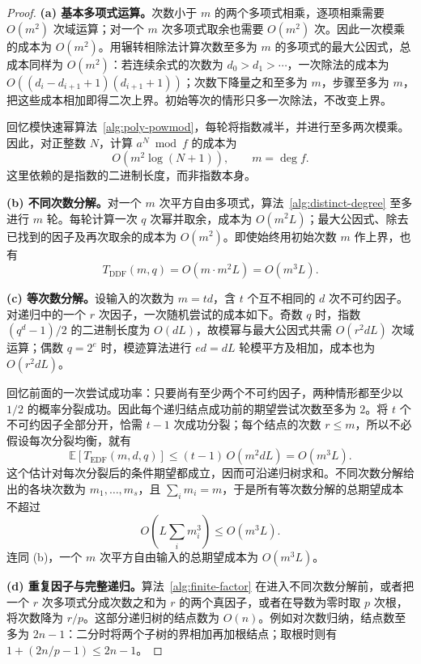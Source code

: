 \documentclass[lang=cn,a4paper,fontset=none,zihao=false,10pt,openany,twoside]{beautybook}
\numberwithin{algorithm}{chapter}
\begin{document}
\begin{proof}
\par\smallskip\noindent\textbf{(a) 基本多项式运算。}\quad 次数小于 $m$ 的两个多项式相乘，逐项相乘需要 $O(m^2)$ 次域运算；对一个 $m$ 次多项式取余也需要 $O(m^2)$ 次。因此一次模乘的成本为 $O(m^2)$。用辗转相除法计算次数至多为 $m$ 的多项式的最大公因式，总成本同样为 $O(m^2)$：若连续余式的次数为 $d_0>d_1>\cdots$，一次除法的成本为 $O((d_i-d_{i+1}+1)(d_{i+1}+1))$；次数下降量之和至多为 $m$，步骤至多为 $m$，把这些成本相加即得二次上界。初始等次的情形只多一次除法，不改变上界。

回忆模快速幂算法~\ref{alg:poly-powmod}，每轮将指数减半，并进行至多两次模乘。因此，对正整数 $N$，计算 $a^N\bmod f$ 的成本为
\[
 O(m^2\log(N+1)),\qquad m=\deg f.
\]
这里依赖的是指数的二进制长度，而非指数本身。

\par\smallskip\noindent\textbf{(b) 不同次数分解。}\quad 对一个 $m$ 次平方自由多项式，算法~\ref{alg:distinct-degree} 至多进行 $m$ 轮。每轮计算一次 $q$ 次幂并取余，成本为 $O(m^2L)$；最大公因式、除去已找到的因子及再次取余的成本为 $O(m^2)$。即使始终用初始次数 $m$ 作上界，也有
\[
 T_{\mathrm{DDF}}(m,q)=O(m\cdot m^2L)=O(m^3L).
\]

\par\smallskip\noindent\textbf{(c) 等次数分解。}\quad 设输入的次数为 $m=td$，含 $t$ 个互不相同的 $d$ 次不可约因子。对递归中的一个 $r$ 次因子，一次随机尝试的成本如下。奇数 $q$ 时，指数 $(q^d-1)/2$ 的二进制长度为 $O(dL)$，故模幂与最大公因式共需 $O(r^2dL)$ 次域运算；偶数 $q=2^e$ 时，模迹算法进行 $ed=dL$ 轮模平方及相加，成本也为 $O(r^2dL)$。

回忆前面的一次尝试成功率：只要尚有至少两个不可约因子，两种情形都至少以 $1/2$ 的概率分裂成功。因此每个递归结点成功前的期望尝试次数至多为 $2$。将 $t$ 个不可约因子全部分开，恰需 $t-1$ 次成功分裂；每个结点的次数 $r\le m$，所以不必假设每次分裂均衡，就有
\[
 \mathbb E[T_{\mathrm{EDF}}(m,d,q)]
 \le (t-1)\,O(m^2dL)
 =O(m^3L).
\]
这个估计对每次分裂后的条件期望都成立，因而可沿递归树求和。不同次数分解给出的各块次数为 $m_1,\ldots,m_s$，且 $\sum_i m_i=m$，于是所有等次数分解的总期望成本不超过
\[
 O\!\left(L\sum_i m_i^3\right)\le O(m^3L).
\]
连同 (b)，一个 $m$ 次平方自由输入的总期望成本为 $O(m^3L)$。

\par\smallskip\noindent\textbf{(d) 重复因子与完整递归。}\quad 算法~\ref{alg:finite-factor} 在进入不同次数分解前，或者把一个 $r$ 次多项式分成次数之和为 $r$ 的两个真因子，或者在导数为零时取 $p$ 次根，将次数降为 $r/p$。这部分递归树的结点数为 $O(n)$。例如对次数归纳，结点数至多为 $2n-1$：二分时将两个子树的界相加再加根结点；取根时则有 $1+(2n/p-1)\le2n-1$。


\end{proof}
\end{document}
